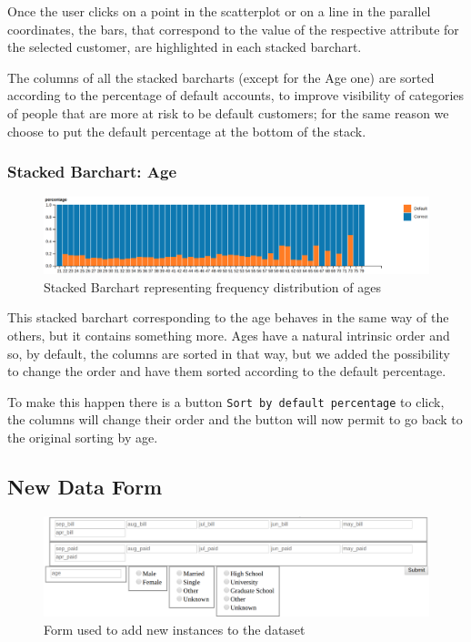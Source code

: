 \documentclass[journal]{vgtc}                %
\begin{document}
Once the user clicks on a point in the scatterplot or on a line in the parallel coordinates, the bars, that correspond to the value of the respective attribute for the selected customer, are highlighted in each stacked barchart.

The columns of all the stacked barcharts (except for the Age one) are sorted according to the percentage of default accounts, to improve visibility of categories of people that are more at risk to be default customers; for the same
reason we choose to put the default percentage at the bottom of the stack.

\subsubsection{Stacked Barchart: Age}
\begin{figure}[h]
  \centering
  \includegraphics[scale=0.13]{age}
  \caption{Stacked Barchart representing frequency distribution of ages}
  \label{age}
\end{figure}

This stacked barchart corresponding to the age behaves in the same way of the others, but it contains something more.
Ages have a natural intrinsic order and so, by default, the columns are sorted in that way, but we added the possibility
to change the order and have them sorted according to the default percentage.

To make this happen there is a button \texttt{Sort by default percentage} to click, the columns will change their order and
the button will now permit to go back to the original sorting by age.

\subsection{New Data Form}
\begin{figure}[h]
  \centering
  \includegraphics[scale=0.1]{form}
  \caption{Form used to add new instances to the dataset}
  \label{form}
\end{figure}
\end{document}
